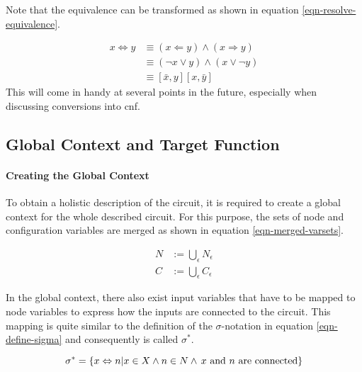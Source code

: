 	Note that the equivalence can be transformed as shown in equation \ref{eqn-resolve-equivalence}. 

	\begin{equation}
	\begin{aligned}
		x \Leftrightarrow y 
		&\equiv \left( x \Leftarrow y \right) \wedge \left( x \Rightarrow y \right) \\
		&\equiv \left( \neg x \vee y \right) \wedge \left( x \vee \neg y \right) \\
		&\equiv \left[ \bar{x}, y \right] \left[ x, \bar{y} \right]
	\end{aligned}
	\label{eqn-resolve-equivalence}
	\end{equation}
	This will come in handy at several points in the future, especially when discussing conversions into \gls{cnf}.
	
\subsection{Global Context and Target Function}

	\paragraph{Creating the Global Context}
	To obtain a holistic description of the circuit, it is required to create a global context for the whole described circuit.
	For this purpose, the sets of node and configuration variables are merged as shown in equation \ref{eqn-merged-varsets}.
	
	\begin{equation}
	\begin{aligned}
		N &:= \bigcup_\epsilon N_\epsilon \\
		C &:= \bigcup_\epsilon C_\epsilon
	\end{aligned}
	\label{eqn-merged-varsets}
	\end{equation}
	
	In the global context, there also exist input variables that have to be mapped to node variables to express how the inputs are connected to the circuit.
	This mapping is quite similar to the definition of the $\sigma$-notation in equation \ref{eqn-define-sigma} and consequently is called $\sigma^*$.
	
	\begin{equation}
	\sigma^* = 
	\left\lbrace	
		x \Leftrightarrow n \\
	\vert
		x \in X \wedge
		n \in N \wedge
		\, \text{$x$ and $n$ are connected}
	\right\rbrace
	\label{eqn-define-sigma-star}
	\end{equation}
	
